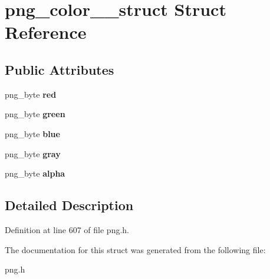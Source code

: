 \hypertarget{structpng__color__8__struct}{\section{png\+\_\+color\+\_\+\_\+struct Struct Reference}
\label{structpng__color__8__struct}
}
\subsection*{Public Attributes}
\begin{DoxyCompactItemize}
\item 
\hypertarget{structpng__color__8__struct_a5cd91bb4b3429256b84e6f28c72778b8}{png\+\_\+byte {\bfseries red}}\label{structpng__color__8__struct_a5cd91bb4b3429256b84e6f28c72778b8}

\item 
\hypertarget{structpng__color__8__struct_a40d053224177df35c037525b39563b05}{png\+\_\+byte {\bfseries green}}\label{structpng__color__8__struct_a40d053224177df35c037525b39563b05}

\item 
\hypertarget{structpng__color__8__struct_a58225d3b6426185d5a40d3c9935db96a}{png\+\_\+byte {\bfseries blue}}\label{structpng__color__8__struct_a58225d3b6426185d5a40d3c9935db96a}

\item 
\hypertarget{structpng__color__8__struct_a574edc173d956cca144927262e88653e}{png\+\_\+byte {\bfseries gray}}\label{structpng__color__8__struct_a574edc173d956cca144927262e88653e}

\item 
\hypertarget{structpng__color__8__struct_af1c7203aefe12bd35dc9a4cdd58e7a4b}{png\+\_\+byte {\bfseries alpha}}\label{structpng__color__8__struct_af1c7203aefe12bd35dc9a4cdd58e7a4b}

\end{DoxyCompactItemize}


\subsection{Detailed Description}


Definition at line 607 of file png.\+h.



The documentation for this struct was generated from the following file\+:\begin{DoxyCompactItemize}
\item 
png.\+h\end{DoxyCompactItemize}
